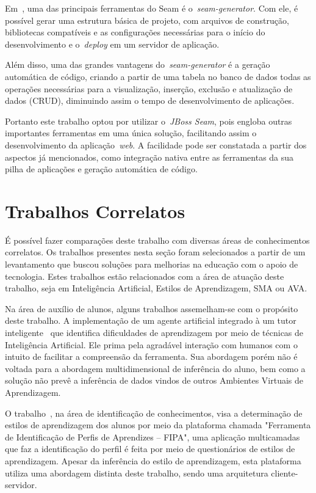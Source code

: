 Em~\cite{allen09}, uma das principais ferramentas do Seam é o~\emph{seam-generator}. Com ele, é possível gerar uma estrutura básica de projeto, com arquivos de construção, bibliotecas compatíveis e as configurações necessárias para o início do desenvolvimento e o~\emph{deploy} em um servidor de aplicação.

Além disso, uma das grandes vantagens do~\emph{seam-generator} é a geração automática de código, criando a partir de uma tabela no banco de dados todas as operações necessárias para a visualização, inserção, exclusão e atualização de dados (CRUD), diminuindo assim o tempo de desenvolvimento de aplicações.

Portanto este trabalho optou por utilizar o~\emph{JBoss Seam}, pois engloba outras importantes ferramentas em uma única solução, facilitando assim o desenvolvimento da aplicação~\emph{web}. A facilidade pode ser constatada a partir dos aspectos já mencionados, como integração nativa entre as ferramentas da sua pilha de aplicações e geração automática de código.

\section{Trabalhos Correlatos}
É possível fazer comparações deste trabalho com diversas áreas de conhecimentos correlatos. Os trabalhos presentes nesta seção foram selecionados a partir de um levantamento que buscou soluções para melhorias na educação com o apoio de tecnologia. Estes trabalhos estão relacionados com a área de atuação deste trabalho, seja em Inteligência Artificial, Estilos de Aprendizagem, SMA ou AVA.

Na área de auxílio de alunos, alguns trabalhos assemelham-se com o propósito deste trabalho. A implementação de um agente artificial integrado à um tutor inteligente~\cite{soaresagente} que identifica dificuldades de aprendizagem por meio de técnicas de Inteligência Artificial. Ele prima pela agradável interação com humanos com o intuito de facilitar a compreensão da ferramenta. Sua abordagem porém não é voltada para a abordagem multidimensional de inferência do aluno, bem como a solução não prevê a inferência de dados vindos de outros Ambientes Virtuais de Aprendizagem.

O trabalho~\cite{bativa2011}, na área de identificação de conhecimentos, visa a determinação de estilos de aprendizagem dos alunos por meio da plataforma chamada "Ferramenta de Identificação de Perfis de Aprendizes – FIPA", uma aplicação multicamadas que faz a identificação do perfil é feita por meio de questionários de estilos de aprendizagem. Apesar da inferência do estilo de aprendizagem, esta plataforma utiliza uma abordagem distinta deste trabalho, sendo uma arquitetura cliente-servidor. 

